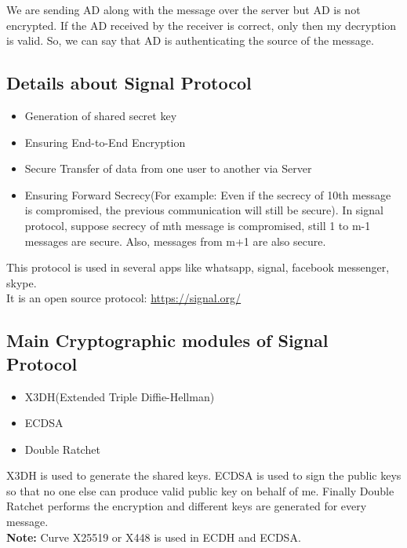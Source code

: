 \documentclass[11pt]{article}
\begin{document}
We are sending AD along with the message over the server but AD is not encrypted. If the AD received by the receiver is correct, only then my decryption is valid. So, we can say that AD is authenticating the source of the message. 

\subsection{Details about Signal Protocol}
\begin{itemize}
    \item Generation of shared secret key
    \item Ensuring End-to-End Encryption
    \item Secure Transfer of data from one user to another via Server
    \item Ensuring Forward Secrecy(For example: Even if the secrecy of 10th message is compromised, the previous communication will still be secure). In signal protocol, suppose secrecy of mth message is compromised, still 1 to m-1 messages are secure. Also, messages from m+1 are also secure.
\end{itemize}
This protocol is used in several apps like whatsapp, signal, facebook messenger, skype.\\
It is an open source protocol: \href{https://signal.org/}{https://signal.org/}
\subsection{Main Cryptographic modules of Signal Protocol}
\begin{itemize}
    \item X3DH(Extended Triple Diffie-Hellman)
    \item ECDSA
    \item Double Ratchet
\end{itemize}
X3DH is used to generate the shared keys. ECDSA is used to sign the public keys so that no one else can produce valid public key on behalf of me. Finally Double Ratchet performs the encryption and different keys are generated for every message.\\
\textbf{Note:} Curve X25519 or X448 is used in ECDH and ECDSA.\\
\end{document}
